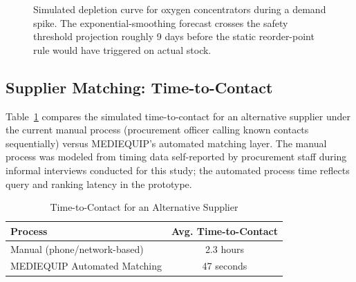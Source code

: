 \documentclass[conference]{IEEEtran}
\begin{document}
\begin{figure}[htbp]
\centering
{}
\caption{Simulated depletion curve for oxygen concentrators during a demand spike. The exponential-smoothing forecast crosses the safety threshold projection roughly 9 days before the static reorder-point rule would have triggered on actual stock.}
\label{fig:depletion}
\end{figure}

\subsection{Supplier Matching: Time-to-Contact}

Table~\ref{tab:matching} compares the simulated time-to-contact for an alternative supplier under the current manual process (procurement officer calling known contacts sequentially) versus MEDIEQUIP's automated matching layer. The manual process was modeled from timing data self-reported by procurement staff during informal interviews conducted for this study; the automated process time reflects query and ranking latency in the prototype.

\begin{table}[htbp]
\caption{Time-to-Contact for an Alternative Supplier}
\begin{center}
\begin{tabular}{@{}lc@{}}
\toprule
\textbf{Process} & \textbf{Avg. Time-to-Contact} \\
\midrule
Manual (phone/network-based) & 2.3 hours \\
MEDIEQUIP Automated Matching & 47 seconds \\
\bottomrule
\end{tabular}
\label{tab:matching}
\end{center}
\end{table}
\end{document}
